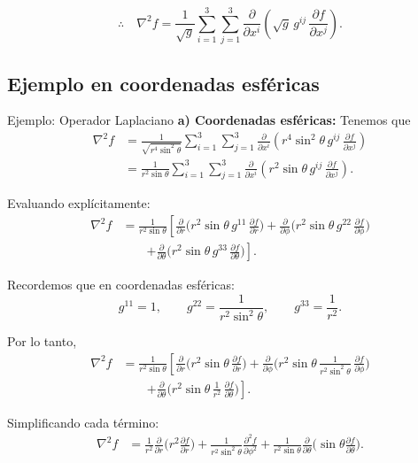 \documentclass[../apunte_mecanica_clasica.tex]{subfiles}%
\begin{document}
\[
    \therefore \quad 
    \nabla^2 f = \frac{1}{\sqrt{g}} \sum_{i=1}^3 \sum_{j=1}^3 
    \frac{\partial}{\partial x^i}\!\left(\sqrt{g}\, g^{ij}\,\frac{\partial f}{\partial x^j}\right).
\]


\subsection{Ejemplo en coordenadas esféricas}

\begin{apuntebloque}{Ejemplo: Operador Laplaciano}
\textbf{a) Coordenadas esféricas:}  
Tenemos que
\begin{align*}
    \nabla^2 f 
    &= \frac{1}{\sqrt{r^4 \sin^2\theta}} 
       \sum_{i=1}^3 \sum_{j=1}^3 
       \frac{\partial}{\partial x^i} 
       \left( r^4 \sin^2\theta \, g^{ij} \,\frac{\partial f}{\partial x^j} \right) \\[6pt]
    &= \frac{1}{r^2 \sin\theta} 
       \sum_{i=1}^3 \sum_{j=1}^3 
       \frac{\partial}{\partial x^i} 
       \left( r^2 \sin\theta \, g^{ij} \,\frac{\partial f}{\partial x^j} \right).
\end{align*}

Evaluando explícitamente:
\begin{align*}
    \nabla^2 f 
    &= \frac{1}{r^2 \sin\theta} 
       \left[
          \frac{\partial}{\partial r} \Big( r^2 \sin\theta \, g^{11}\,\frac{\partial f}{\partial r} \Big)
          + \frac{\partial}{\partial \phi} \Big( r^2 \sin\theta \, g^{22}\,\frac{\partial f}{\partial \phi} \Big) \right. \\[6pt]
    &\qquad \left. + \frac{\partial}{\partial \theta} \Big( r^2 \sin\theta \, g^{33}\,\frac{\partial f}{\partial \theta} \Big)
       \right].
\end{align*}

Recordemos que en coordenadas esféricas:
\begin{equation*}
    g^{11} = 1, 
    \qquad g^{22} = \frac{1}{r^2 \sin^2\theta}, 
    \qquad g^{33} = \frac{1}{r^2}.
\end{equation*}
    

Por lo tanto,
\begin{align*}
    \nabla^2 f 
    &= \frac{1}{r^2 \sin\theta} 
       \left[
          \frac{\partial}{\partial r}\!\Big(r^2 \sin\theta \,\frac{\partial f}{\partial r}\Big)
          + \frac{\partial}{\partial \phi}\!\Bigg(r^2 \sin\theta \,\frac{1}{r^2 \sin^2\theta}\,\frac{\partial f}{\partial \phi}\Bigg) \right. \\[6pt]
    &\qquad \left. + \frac{\partial}{\partial \theta}\!\Bigg(r^2 \sin\theta \,\frac{1}{r^2}\,\frac{\partial f}{\partial \theta}\Bigg)
       \right].
\end{align*}

Simplificando cada término:
\begin{align*}
    \nabla^2 f
    &= \frac{1}{r^2} \frac{\partial}{\partial r}\!\Big(r^2 \frac{\partial f}{\partial r}\Big)
       + \frac{1}{r^2 \sin^2\theta} \frac{\partial^2 f}{\partial \phi^2}
       + \frac{1}{r^2 \sin\theta} \frac{\partial}{\partial \theta}\!\Big(\sin\theta \frac{\partial f}{\partial \theta}\Big).
\end{align*}
\end{apuntebloque}

\newpage
\end{document}
